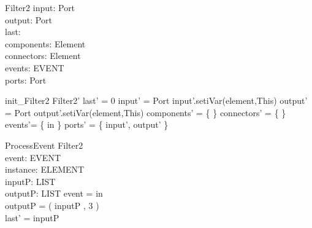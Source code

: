 \begin{schema}{Filter2}
input:  Port \\
output: Port \\
last: \nat \\
components: \pset Element \\
connectors: \pset Element \\
events: \pset EVENT \\
ports: \pset Port 
\end{schema}


\begin{zed}
init\_Filter2 \sdef \lsch Filter2' \bbar last' = 0 \land input' = \new Port \land input'.setiVar(element,This) \land output' = \new Port \land output'.setiVar(element,This) \land  components' = \{ \} \land  connectors' = \{ \} \land events'= \{ in \}  \land ports' = \{ input', output'   \} \rsch  \end{zed}


\begin{schema}{ProcessEvent}
\Delta Filter2 \\
event: EVENT \\
instance: ELEMENT \\
inputP: LIST \\
outputP: LIST 
\where event = in \\
outputP = \sort( inputP , 3 ) \\
last' = inputP
\end{schema}
